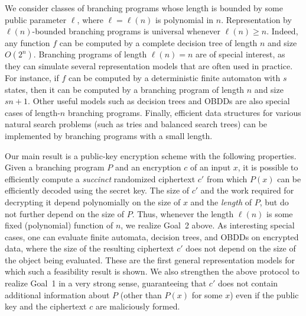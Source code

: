 \documentclass{article}
\begin{document}
We consider classes of branching programs whose length is bounded by
some public parameter $\ell$, where $\ell=\ell(n)$ is polynomial in
$n$. Representation by $\ell(n)$-bounded branching programs is
universal whenever $\ell(n)\ge n$. Indeed, any function $f$ can be
computed by a complete decision tree of length $n$ and size
$O(2^n)$. Branching programs of length $\ell(n)=n$ are of special
interest, as they can simulate several representation models that
are often used in practice.  For instance, if $f$ can be computed by
a deterministic finite automaton with $s$ states, then it can be
computed by a branching program of length $n$ and size $sn+1$. Other
useful models such as decision trees and OBDDs are also special
cases of length-$n$ branching programs. Finally, efficient data
structures for various natural search problems (such as tries and
balanced search trees) can be implemented by branching programs with
a small length.

Our main result is a public-key encryption scheme with the
following properties. Given a branching program $P$ and an
encryption $c$ of an input $x$, it is possible to efficiently
compute a {\em succinct} randomized ciphertext $c'$ from which
$P(x)$ can be efficiently decoded using the secret key. The size of
$c'$ and the work required for decrypting it depend polynomially on
the size of $x$ and the {\em length} of $P$, but do not further
depend on the size of $P$. Thus, whenever the length $\ell(n)$ is
some fixed (polynomial) function of $n$, we realize Goal~2 above.
As interesting special cases, one can evaluate finite automata,
decision trees, and OBDDs on encrypted data, where the size of the
resulting ciphertext $c'$ does not depend on the size of the object
being evaluated. These are the first general representation models
for which such a feasibility result is shown. We also strengthen
the above protocol to realize Goal~1 in a very strong sense,
guaranteeing that $c'$ does not contain additional information
about $P$ (other than $P(x)$ for some $x$) even if the public key
and the ciphertext $c$ are maliciously formed.
\end{document}
